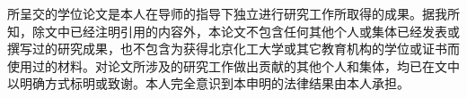 \begin{declear}
	所呈交的学位论文是本人在导师的指导下独立进行研究工作所取得的成果。据我所知，除文中已经注明引用的内容外，本论文不包含任何其他个人或集体已经发表或撰写过的研究成果，也不包含为获得北京化工大学或其它教育机构的学位或证书而使用过的材料。对论文所涉及的研究工作做出贡献的其他个人和集体，均已在文中以明确方式标明或致谢。本人完全意识到本申明的法律结果由本人承担。
	
	\addsign			%
	\addsigndate		%
\end{declear}

